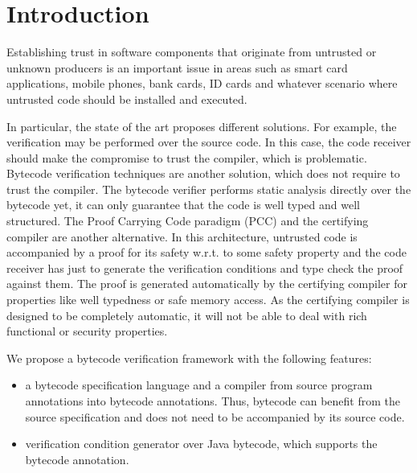 \section{Introduction}\label{intro}
Establishing trust in software components that originate from untrusted or unknown producers is an important issue in areas such as
 smart card applications, mobile phones, bank cards, ID cards and whatever scenario where untrusted code should be installed and executed.

In particular, the state of the art proposes different solutions. For example,
 the verification may be performed over the source code. In this case, the code receiver should make the compromise to trust the compiler, which is problematic. Bytecode verification techniques \cite{Ljbc} are another solution, which does not require to trust the compiler. 
The bytecode verifier performs static analysis directly over the bytecode yet, it can only guarantee that 
the code is well typed and well structured. %
The Proof Carrying Code paradigm (PCC) and the certifying compiler \cite{ComNec,DesNecLee98} are another alternative.
 In this architecture, untrusted code
is accompanied by a proof for its safety w.r.t. to some safety property and the code receiver has just to generate the 
verification conditions and type check the proof against them. 
The proof is generated automatically by the certifying compiler for properties like well typedness or safe memory access. 
As the certifying compiler is designed to be completely automatic, it will not be able to deal with rich functional or security properties. 
 
We propose a bytecode verification framework with the following features:
\begin{itemize}
  \item a bytecode specification language and a compiler from source program annotations into bytecode annotations.
 Thus, bytecode can benefit from the source specification and does not need to be accompanied by its source code. 

   \item verification condition generator over Java bytecode, which supports
the bytecode annotation. 
\end{itemize}


